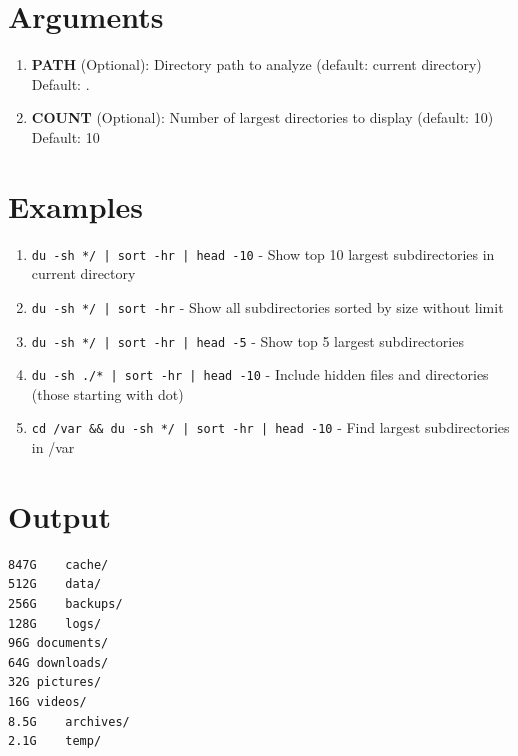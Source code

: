 \documentclass[openany]{book}
\begin{document}
\section*{Arguments}
\begin{enumerate}
  \item \textbf{PATH} (Optional): Directory path to analyze (default: current directory) \\ Default: .
  \item \textbf{COUNT} (Optional): Number of largest directories to display (default: 10) \\ Default: 10
\end{enumerate}

\section*{Examples}
\begin{enumerate}
  \item \texttt{du -sh */ | sort -hr | head -10} - Show top 10 largest subdirectories in current directory
  \item \texttt{du -sh */ | sort -hr} - Show all subdirectories sorted by size without limit
  \item \texttt{du -sh */ | sort -hr | head -5} - Show top 5 largest subdirectories
  \item \texttt{du -sh ./* | sort -hr | head -10} - Include hidden files and directories (those starting with dot)
  \item \texttt{cd /var \&\& du -sh */ | sort -hr | head -10} - Find largest subdirectories in /var
\end{enumerate}

\section*{Output}
\begin{lstlisting}
847G	cache/
512G	data/
256G	backups/
128G	logs/
96G	documents/
64G	downloads/
32G	pictures/
16G	videos/
8.5G	archives/
2.1G	temp/
\end{lstlisting}
\end{document}
